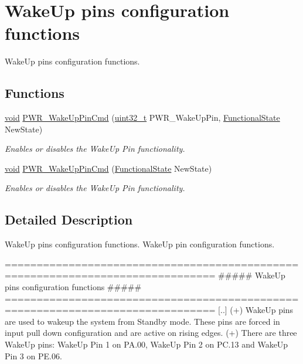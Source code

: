 \hypertarget{group___p_w_r___group3}{\section{Wake\-Up pins configuration functions}
\label{group___p_w_r___group3}
}


Wake\-Up pins configuration functions.  


\subsection*{Functions}
\begin{DoxyCompactItemize}
\item 
\hyperlink{group___n_a_m_e_ga18028b8badbf1ea7e704ccac3c488e82}{void} \hyperlink{group___p_w_r___group3_ga62083ec62f56c8f7a81afa4b6e04aff3}{P\-W\-R\-\_\-\-Wake\-Up\-Pin\-Cmd} (\hyperlink{stdint_8h_a435d1572bf3f880d55459d9805097f62}{uint32\-\_\-t} P\-W\-R\-\_\-\-Wake\-Up\-Pin, \hyperlink{group___exported__types_gac9a7e9a35d2513ec15c3b537aaa4fba1}{Functional\-State} New\-State)
\begin{DoxyCompactList}\small\item\em Enables or disables the Wake\-Up Pin functionality. \end{DoxyCompactList}\item 
\hyperlink{group___n_a_m_e_ga18028b8badbf1ea7e704ccac3c488e82}{void} \hyperlink{group___p_w_r___group3_gae5fd6f9336ef8c60d5483651cb0d1a00}{P\-W\-R\-\_\-\-Wake\-Up\-Pin\-Cmd} (\hyperlink{group___exported__types_gac9a7e9a35d2513ec15c3b537aaa4fba1}{Functional\-State} New\-State)
\begin{DoxyCompactList}\small\item\em Enables or disables the Wake\-Up Pin functionality. \end{DoxyCompactList}\end{DoxyCompactItemize}


\subsection{Detailed Description}
Wake\-Up pins configuration functions. Wake\-Up pin configuration functions.

\begin{DoxyVerb} ===============================================================================
              ##### WakeUp pins configuration functions #####
 ===============================================================================  
    [..]
    (+) WakeUp pins are used to wakeup the system from Standby mode. These pins are 
        forced in input pull down configuration and are active on rising edges.
    (+) There are three WakeUp pins: WakeUp Pin 1 on PA.00, WakeUp Pin 2 on PC.13 and
        WakeUp Pin 3 on PE.06.\end{DoxyVerb}


